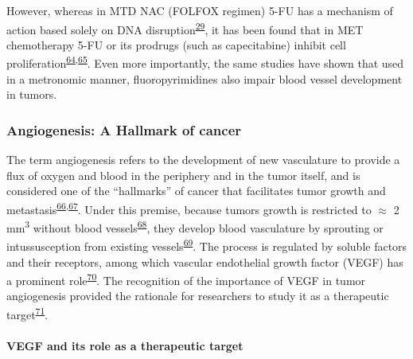 \documentclass[11pt]{umnthesis}
\begin{document}
However, whereas in MTD NAC (FOLFOX regimen) 5-FU has a mechanism of action based solely on DNA disruption\textsuperscript{\protect\hyperlink{ref-housman2014}{29}}, it has been found that in MET chemotherapy 5-FU or its prodrugs (such as capecitabine) inhibit cell proliferation\textsuperscript{\protect\hyperlink{ref-yuan2015}{64},\protect\hyperlink{ref-shi2014}{65}}. Even more importantly, the same studies have shown that used in a metronomic manner, fluoropyrimidines also impair blood vessel development in tumors.

\hypertarget{angiogenesis-a-hallmark-of-cancer}{%
\subsubsection{Angiogenesis: A Hallmark of cancer}\label{angiogenesis-a-hallmark-of-cancer}}

The term angiogenesis refers to the development of new vasculature to provide a flux of oxygen and blood in the periphery and in the tumor itself, and is considered one of the ``hallmarks'' of cancer that facilitates tumor growth and metastasis\textsuperscript{\protect\hyperlink{ref-farnsworth2013}{66},\protect\hyperlink{ref-hanahan2011}{67}}. Under this premise, because tumors growth is restricted to \(\approx\) 2 mm\textsuperscript{3} without blood vessels\textsuperscript{\protect\hyperlink{ref-muthukkaruppan1982}{68}}, they develop blood vasculature by sprouting or intussusception from existing vessels\textsuperscript{\protect\hyperlink{ref-carmeliet2000}{69}}. The process is regulated by soluble factors and their receptors, among which vascular endothelial growth factor (VEGF) has a prominent role\textsuperscript{\protect\hyperlink{ref-hanahan2000}{70}}. The recognition of the importance of VEGF in tumor angiogenesis provided the rationale for researchers to study it as a therapeutic target\textsuperscript{\protect\hyperlink{ref-ferrara2004}{71}}.

\hypertarget{vegf-and-its-role-as-a-therapeutic-target}{%
\paragraph{VEGF and its role as a therapeutic target}\label{vegf-and-its-role-as-a-therapeutic-target}}
\end{document}
